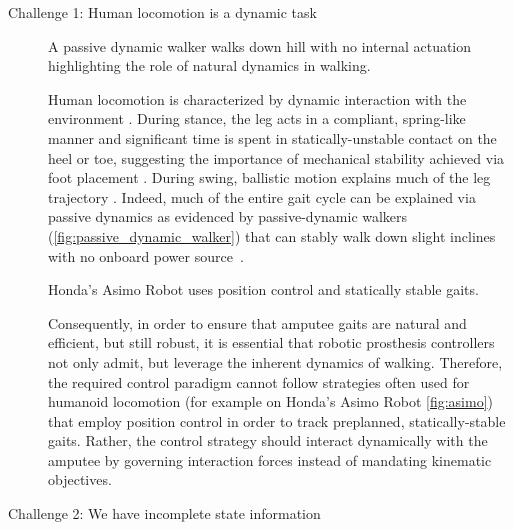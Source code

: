 \begin{description}
    \item[Challenge 1: Human locomotion is a dynamic task] 
    \begin{marginfigure}[-3in]
        \centering
        \caption{A passive dynamic walker walks down hill with no internal
        actuation highlighting the role of natural dynamics in walking.}
        \label{fig:passive_dynamic_walker}
    \end{marginfigure}
    
    Human locomotion is characterized by dynamic interaction with the
    environment \citep{mcgeer_1992}. During stance, the leg acts in a compliant,
    spring-like manner \citep{geyer2006compliant} and significant time is spent
    in statically-unstable contact on the heel or toe, suggesting the importance
    of mechanical stability achieved via foot placement \citep{perry1992gait}.
    During swing, ballistic motion explains much of the leg trajectory
    \citep{mochon1980ballistic}. Indeed, much of the entire gait cycle can be
    explained via passive dynamics as evidenced by passive-dynamic walkers
    (\cref{fig:passive_dynamic_walker}) that can stably walk down slight
    inclines with no onboard power source~\citep{mcgeer1990passive,
    collins2005efficient}.

    \begin{marginfigure}[-1.5in]
        \centering
        \caption{Honda's Asimo Robot uses position control and statically
        stable gaits.}
        \label{fig:asimo}
    \end{marginfigure}

    Consequently, in order to ensure that amputee gaits are natural and
    efficient, but still robust, it is essential that robotic prosthesis
    controllers not only admit, but leverage the inherent dynamics of walking.
    Therefore, the required control paradigm cannot follow strategies often used
    for humanoid locomotion (for example on Honda's Asimo Robot
    \cref{fig:asimo}) that employ position control in order to track preplanned,
    statically-stable gaits. Rather, the control strategy should interact
    dynamically with the amputee by governing interaction forces instead of
    mandating kinematic objectives.

    \item[Challenge 2: We have incomplete state information]


\end{description}
